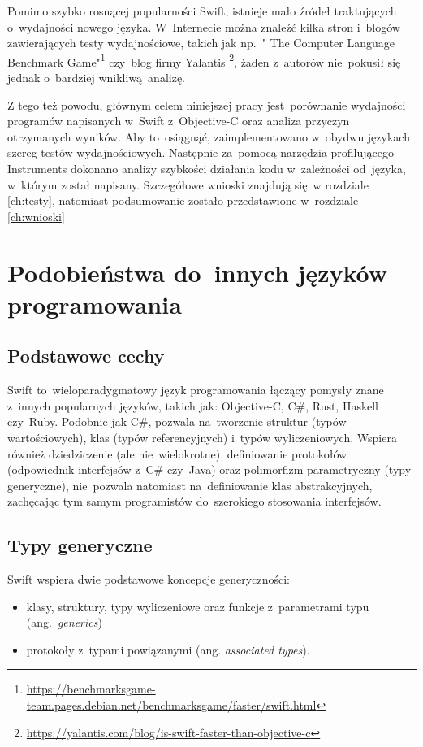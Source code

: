 \documentclass[mgr, shortabstract]{iithesis}
\newcommand{\ang}[1]{ang.~\textit{#1}}
\begin{document}
Pomimo szybko rosnącej popularności Swift, istnieje mało źródeł traktujących o~wydajności nowego języka. W~Internecie można znaleźć kilka stron i~blogów zawierających testy wydajnościowe, takich jak np.~" The Computer Language Benchmark Game"\footnote{\url{https://benchmarksgame-team.pages.debian.net/benchmarksgame/faster/swift.html}} czy~blog firmy Yalantis \footnote{\url{https://yalantis.com/blog/is-swift-faster-than-objective-c}}, żaden z~autorów nie~pokusił się jednak o~bardziej wnikliwą analizę. 

Z tego też powodu, głównym celem niniejszej pracy jest~porównanie wydajności programów napisanych w~Swift z~Objective-C oraz analiza przyczyn otrzymanych wyników. Aby to~osiągnąć, zaimplementowano w~obydwu językach szereg testów wydajnościowych. Następnie za~pomocą narzędzia profilującego Instruments dokonano analizy szybkości działania kodu w~zależności od~języka, w~którym został napisany. Szczegółowe wnioski znajdują się w rozdziale \ref{ch:testy}, natomiast podsumowanie zostało przedstawione w~rozdziale \ref{ch:wnioski}

\chapter{Podobieństwa do~innych języków programowania}
\label{ch:podobienstwa_do_innych}

\section{Podstawowe cechy}
\label{s:podstawowe_cechy}

Swift to~wieloparadygmatowy język programowania łączący pomysły znane z~innych popularnych języków, takich jak: Objective-C, C\#, Rust, Haskell czy~Ruby. Podobnie jak C\#, pozwala na~tworzenie struktur (typów wartościowych), klas (typów referencyjnych) i~typów wyliczeniowych. Wspiera również dziedziczenie (ale nie~wielokrotne), definiowanie protokołów (odpowiednik interfejsów z~C\# czy~Java) oraz polimorfizm parametryczny (typy generyczne), nie~pozwala natomiast na~definiowanie klas abstrakcyjnych, zachęcając tym samym programistów do~szerokiego stosowania interfejsów.

\section{Typy generyczne}
\label{s:typy_generyczne}

Swift wspiera dwie podstawowe koncepcje generyczności:
\begin{itemize}
  \item klasy, struktury, typy wyliczeniowe oraz funkcje z~parametrami typu (\ang{generics})
  \item protokoły z~typami powiązanymi (ang. \textit{associated types}).
\end{itemize}
\end{document}
